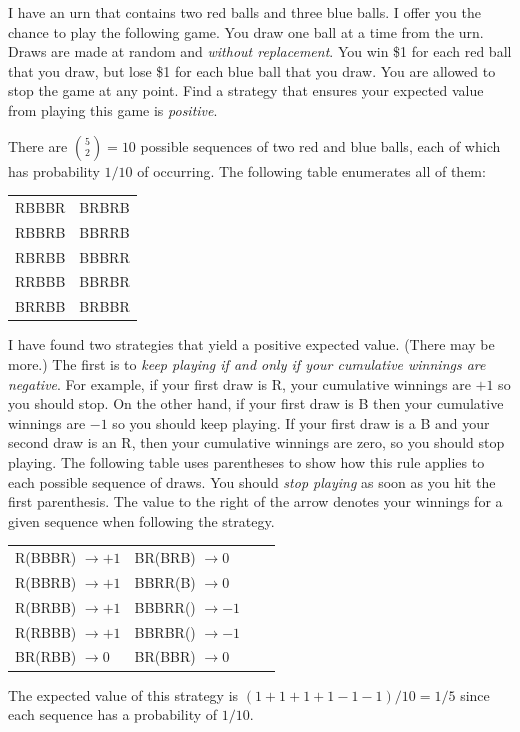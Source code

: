\documentclass[addpoints,12pt]{exam}\usepackage[]{graphicx}\usepackage[]{xcolor}
\begin{document}
\begin{questions}
  \question I have an urn that contains two red balls and three blue balls.
  I offer you the chance to play the following game. You draw one ball at a time from the urn. Draws are made at random and \emph{without replacement}. You win \$1 for each red ball that you draw, but lose \$1 for each blue ball that you draw. You are allowed to stop the game at any point. Find a strategy that ensures your expected value from playing this game is \emph{positive}. 
  \begin{solution}
    There are ${5 \choose 2} = 10$ possible sequences of two red and blue balls, each of which has probability $1/10$ of occurring. 
    The following table enumerates all of them:
    \begin{center}
    \begin{tabular}[h]{ll}
      RBBBR & BRBRB\\
      RBBRB & BBRRB\\
      RBRBB & BBBRR\\
      RRBBB & BBRBR\\
      BRRBB & BRBBR
    \end{tabular}
  \end{center}
  I have found two strategies that yield a positive expected value.
  (There may be more.)
  The first is to \emph{keep playing if and only if your cumulative winnings are negative}.
  For example, if your first draw is R, your cumulative winnings are $+1$ so you should stop.
  On the other hand, if your first draw is B then your cumulative winnings are $-1$ so you should keep playing. 
  If your first draw is a B and your second draw is an R, then your cumulative winnings are zero, so you should stop playing.
  The following table uses parentheses to show how this rule applies to each possible sequence of draws.
  You should \emph{stop playing} as soon as you hit the first parenthesis.
  The value to the right of the arrow denotes your winnings for a given sequence when following the strategy.
  \begin{center}
    \begin{tabular}[h]{llll}
      R(BBBR) $\rightarrow +1$& BR(BRB) $\rightarrow 0$\\
      R(BBRB) $\rightarrow +1$& BBRR(B) $\rightarrow 0$\\
      R(BRBB) $\rightarrow +1$& BBBRR() $\rightarrow -1$\\
      R(RBBB) $\rightarrow +1$& BBRBR() $\rightarrow -1$\\
      BR(RBB) $\rightarrow 0$& BR(BBR) $\rightarrow 0$
    \end{tabular}
  \end{center}
  The expected value of this strategy is $(1 + 1 + 1 + 1 - 1 - 1)/10 = 1/5$ since each sequence has a probability of $1/10$.


\end{solution}
\end{questions}
\end{document}
